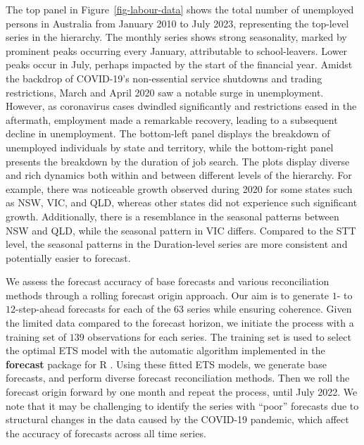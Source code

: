 \documentclass[
  11pt]{article}
\theoremstyle{plain}
\theoremstyle{remark}
\begin{document}
The top panel in Figure~\ref{fig-labour-data} shows the total number of
unemployed persons in Australia from January 2010 to July 2023,
representing the top-level series in the hierarchy. The monthly series
shows strong seasonality, marked by prominent peaks occurring every
January, attributable to school-leavers. Lower peaks occur in July,
perhaps impacted by the start of the financial year. Amidst the backdrop
of COVID-19's non-essential service shutdowns and trading restrictions,
March and April 2020 saw a notable surge in unemployment. However, as
coronavirus cases dwindled significantly and restrictions eased in the
aftermath, employment made a remarkable recovery, leading to a
subsequent decline in unemployment. The bottom-left panel displays the
breakdown of unemployed individuals by state and territory, while the
bottom-right panel presents the breakdown by the duration of job search.
The plots display diverse and rich dynamics both within and between
different levels of the hierarchy. For example, there was noticeable
growth observed during 2020 for some states such as NSW, VIC, and QLD,
whereas other states did not experience such significant growth.
Additionally, there is a resemblance in the seasonal patterns between
NSW and QLD, while the seasonal pattern in VIC differs. Compared to the
STT level, the seasonal patterns in the Duration-level series are more
consistent and potentially easier to forecast.

We assess the forecast accuracy of base forecasts and various
reconciliation methods through a rolling forecast origin approach. Our
aim is to generate \(1\)- to \(12\)-step-ahead forecasts for each of the
\(63\) series while ensuring coherence. Given the limited data compared
to the forecast horizon, we initiate the process with a training set of
\(139\) observations for each series. The training set is used to select
the optimal ETS model with the automatic algorithm implemented in the
\textbf{forecast} package for R \citep{HK08}. Using these fitted ETS
models, we generate base forecasts, and perform diverse forecast
reconciliation methods. Then we roll the forecast origin forward by one
month and repeat the process, until July 2022. We note that it may be
challenging to identify the series with ``poor'' forecasts due to
structural changes in the data caused by the COVID-19 pandemic, which
affect the accuracy of forecasts across all time series.
\end{document}
